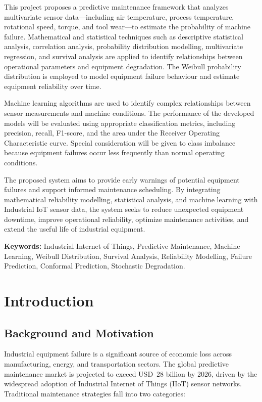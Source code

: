 \documentclass[12pt, a4paper]{article}
\begin{document}
This project proposes a predictive maintenance framework that analyzes multivariate sensor data---including air temperature, process temperature, rotational speed, torque, and tool wear---to estimate the probability of machine failure. Mathematical and statistical techniques such as descriptive statistical analysis, correlation analysis, probability distribution modelling, multivariate regression, and survival analysis are applied to identify relationships between operational parameters and equipment degradation. The Weibull probability distribution is employed to model equipment failure behaviour and estimate equipment reliability over time.

Machine learning algorithms are used to identify complex relationships between sensor measurements and machine conditions. The performance of the developed models will be evaluated using appropriate classification metrics, including precision, recall, F1-score, and the area under the Receiver Operating Characteristic curve. Special consideration will be given to class imbalance because equipment failures occur less frequently than normal operating conditions.

The proposed system aims to provide early warnings of potential equipment failures and support informed maintenance scheduling. By integrating mathematical reliability modelling, statistical analysis, and machine learning with Industrial IoT sensor data, the system seeks to reduce unexpected equipment downtime, improve operational reliability, optimize maintenance activities, and extend the useful life of industrial equipment.

\medskip
\noindent\textbf{Keywords:} Industrial Internet of Things, Predictive Maintenance, Machine Learning, Weibull Distribution, Survival Analysis, Reliability Modelling, Failure Prediction, Conformal Prediction, Stochastic Degradation.


\section{Introduction}

\subsection{Background and Motivation}

Industrial equipment failure is a significant source of economic loss across manufacturing, energy, and transportation sectors. The global predictive maintenance market is projected to exceed USD~28 billion by 2026, driven by the widespread adoption of Industrial Internet of Things (IIoT) sensor networks. Traditional maintenance strategies fall into two categories:
\end{document}
